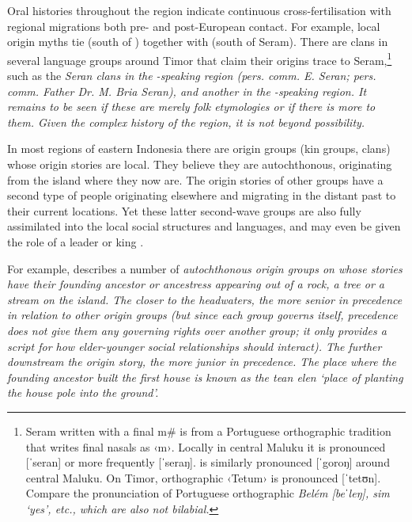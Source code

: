 Oral histories throughout the region indicate continuous
cross-fertilisation with regional migrations both pre- and post-European contact.
For example, local origin myths tie  (south of ) together
with  (south of Seram).
There are clans in several language groups around Timor that
claim their origins trace to Seram,\footnote{
Seram written with
a final m{\#} is from a Portuguese orthographic tradition that
writes final nasals as ‹m›.
Locally in central Maluku it is pronounced [ˈseran] or more frequently [ˈseraŋ].
 is similarly pronounced [ˈgoroŋ] around central Maluku.
On Timor, orthographic ‹Tetum› is pronounced [ˈtetʊn].
Compare the pronunciation of Portuguese orthographic \it{Belém}
[beˈleŋ], \it{sim} ‘yes’, etc., which are also not bilabial.}
such as the \it{Seran} clans in the -speaking region (pers. comm. E. Seran;
pers. comm. Father Dr. M.
Bria Seran), and another in the -speaking region.
It remains to be seen if these are merely folk etymologies or
if there is more to them.
Given the complex history of the region,
it is not beyond possibility.

In most regions of eastern Indonesia there are origin groups
(kin groups, clans) whose origin stories are local.
They believe they are autochthonous,
originating from the island where they now are.
The origin stories of other groups have a second type of people
originating elsewhere and migrating in the distant past to their current locations.
Yet these latter second-wave groups are also fully assimilated
into the local social structures
and languages, and may even be given the role of a leader or
king \citep{Fox1995,Grimes2006}.

For example, \citet[77--84]{Grimes1993} describes a number of \it{autochthonous}
origin groups on  whose stories have their founding ancestor
or ancestress appearing out of a rock,
a tree or a stream on the island.
The closer to the headwaters,
the more senior in precedence in relation to other origin groups
(but since each group governs itself,
precedence does not give them any governing rights over another
group; it only provides a script for how elder-younger social relationships should interact).
The further downstream the origin story,
the more junior in precedence.
The place where the founding ancestor built the first house is
known as the \it{tean elen} ‘place of planting the house pole into the ground’.


